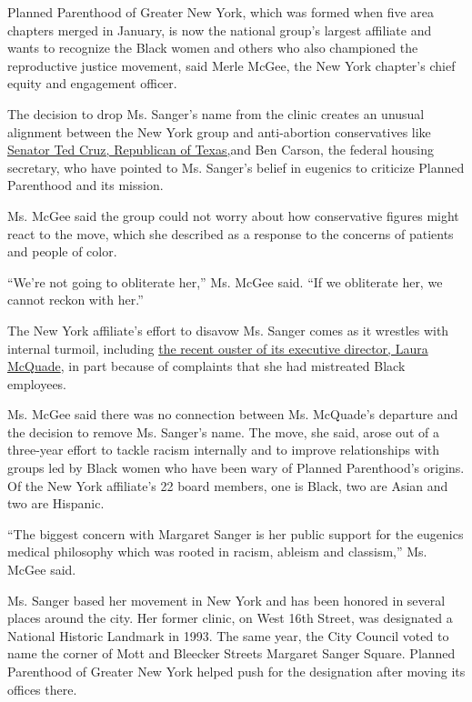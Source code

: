 Planned Parenthood of Greater New York, which was formed when five area
chapters merged in January, is now the national group's largest
affiliate and wants to recognize the Black women and others who also
championed the reproductive justice movement, said Merle McGee, the New
York chapter's chief equity and engagement officer.

The decision to drop Ms. Sanger's name from the clinic creates an
unusual alignment between the New York group and anti-abortion
conservatives like
\href{https://www.cruz.senate.gov/?p=press_release\&id=2476}{Senator Ted
Cruz, Republican of Texas,}and Ben Carson, the federal housing
secretary, who have pointed to Ms. Sanger's belief in eugenics to
criticize Planned Parenthood and its mission.

Ms. McGee said the group could not worry about how conservative figures
might react to the move, which she described as a response to the
concerns of patients and people of color.

``We're not going to obliterate her,'' Ms. McGee said. ``If we
obliterate her, we cannot reckon with her.''

The New York affiliate's effort to disavow Ms. Sanger comes as it
wrestles with internal turmoil, including
\href{https://www.nytimes3xbfgragh.onion/2020/06/23/nyregion/ny-planned-parenthood-laura-mcquade.html}{the
recent ouster of its executive director, Laura McQuade}, in part because
of complaints that she had mistreated Black employees.

Ms. McGee said there was no connection between Ms. McQuade's departure
and the decision to remove Ms. Sanger's name. The move, she said, arose
out of a three-year effort to tackle racism internally and to improve
relationships with groups led by Black women who have been wary of
Planned Parenthood's origins. Of the New York affiliate's 22 board
members, one is Black, two are Asian and two are Hispanic.

``The biggest concern with Margaret Sanger is her public support for the
eugenics medical philosophy which was rooted in racism, ableism and
classism,'' Ms. McGee said.

Ms. Sanger based her movement in New York and has been honored in
several places around the city. Her former clinic, on West 16th Street,
was designated a National Historic Landmark in 1993. The same year, the
City Council voted to name the corner of Mott and Bleecker Streets
Margaret Sanger Square. Planned Parenthood of Greater New York helped
push for the designation after moving its offices there.

